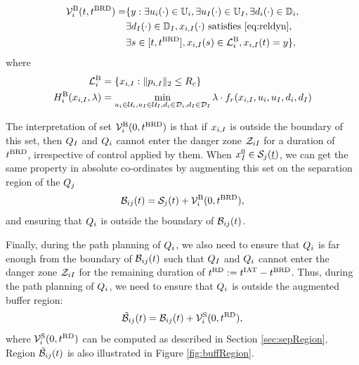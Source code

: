 \begin{equation} \label{eqn:buffBRS}
\begin{aligned}
\brs^{\text{B}}_{i}(t, \brd) = & \{y: \exists \ctrl_i(\cdot) \in \cfset_i, \exists \ctrl_\intr(\cdot) \in \cfset_\intr, \exists \dstb_i(\cdot) \in \dfset_i, \\
& \exists \dstb_\intr(\cdot) \in \dfset_\intr, \state_{i, \intr}(\cdot) \text{ satisfies \eqref{eq:reldyn}},\\
& \exists s \in [t, \brd], \state_{i, \intr}(s) \in \targetset^{\text{B}}_{i}, \state_{i, \intr}(t) = y\},
\end{aligned}
\end{equation}
where 
\begin{equation}
\begin{aligned}
\mathcal{L}^{\text{B}}_{i} &= \{x_{i, I}: \|p_{i, I}\|_2 \le R_c\} \\
H^{\text{B}}_{i}(x_{i, I}, \lambda) &= \min_{u_i \in \mathcal{U}_i, u_I \in \mathcal{U}_I, d_i \in \mathcal{D}_i, d_I \in \mathcal{D}_I} \lambda \cdot f_r(x_{i, I}, u_i, u_I, d_i, d_I)
\end{aligned}
\end{equation}

The interpretation of set $\mathcal{V}^{\text{B}}_{i}(0, t^\text{BRD})$ is that if $x_{i, I}$ is outside the boundary of this set, then $Q_{I}$ and $Q_{i}$ cannot enter the danger zone $\mathcal{Z}_{iI}$ for a duration of $t^\text{BRD}$, irrespective of control applied by them. When $x_{I}^0 \in \mathcal{S}_j(\underline{t})$, we can get the same property in absolute co-ordinates by augmenting this set on the separation region of the $Q_j$
\begin{equation} \label{eqn:buffRegion}
\buff_{ij}(t) = \sep_j(t) + \brs^{\text{B}}_{i}(0, \brd),
\end{equation} 
and ensuring that $Q_i$ is outside the boundary of $\mathcal{B}_{ij}(t)$.

Finally, during the path planning of $Q_i$, we also need to ensure that $Q_i$ is far enough from the boundary of $\mathcal{B}_{ij}(t)$ such that $Q_{I}$ and $Q_{i}$ cannot enter the danger zone $\mathcal{Z}_{iI}$ for the remaining duration of $t^\text{RD} := t^\text{IAT} - t^\text{BRD}$. Thus, during the path planning of $Q_i$, we need to ensure that $Q_i$ is outside the augmented buffer region:
\begin{equation} \label{eqn:augbuffRegion1}
\tilde{\buff}_{ij}(t) = \buff_{ij}(t) + \brs^{\text{S}}_{i}(0, \trd),
\end{equation}
where $\mathcal{V}^{\text{S}}_{i}(0, t^\text{RD})$ can be computed as described in Section \ref{sec:sepRegion}. Region $\tilde{\mathcal{B}}_{ij}(t)$ is also illustrated in Figure \ref{fig:buffRegion}.

